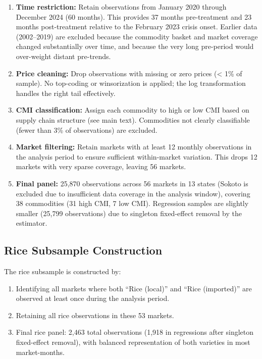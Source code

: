 \documentclass[12pt]{article}
\begin{document}
\begin{enumerate}
\item \textbf{Time restriction:} Retain observations from January 2020 through December 2024 (60 months). This provides 37 months pre-treatment and 23 months post-treatment relative to the February 2023 crisis onset. Earlier data (2002--2019) are excluded because the commodity basket and market coverage changed substantially over time, and because the very long pre-period would over-weight distant pre-trends.

\item \textbf{Price cleaning:} Drop observations with missing or zero prices (< 1\% of sample). No top-coding or winsorization is applied; the log transformation handles the right tail effectively.

\item \textbf{CMI classification:} Assign each commodity to high or low CMI based on supply chain structure (see  main text). Commodities not clearly classifiable (fewer than 3\% of observations) are excluded.

\item \textbf{Market filtering:} Retain markets with at least 12 monthly observations in the analysis period to ensure sufficient within-market variation. This drops 12 markets with very sparse coverage, leaving 56 markets.

\item \textbf{Final panel:} 25,870 observations across 56 markets in 13 states (Sokoto is excluded due to insufficient data coverage in the analysis window), covering 38 commodities (31 high CMI, 7 low CMI). Regression samples are slightly smaller (25,799 observations) due to singleton fixed-effect removal by the estimator.
\end{enumerate}

\subsection{Rice Subsample Construction}

The rice subsample is constructed by:
\begin{enumerate}
\item Identifying all markets where both ``Rice (local)'' and ``Rice (imported)'' are observed at least once during the analysis period.
\item Retaining all rice observations in these 53 markets.
\item Final rice panel: 2,463 total observations (1,918 in regressions after singleton fixed-effect removal), with balanced representation of both varieties in most market-months.
\end{enumerate}
\end{document}
